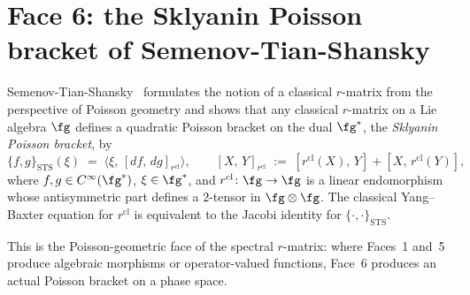 \section{Face 6: the Sklyanin Poisson bracket of Semenov-Tian-Shansky}
\label{sec:hdm-face-6}

\begin{theorem}
\label{thm:hdm-sts-sklyanin-bracket}
Semenov-Tian-Shansky~\cite{STS83} formulates the notion of a
classical $r$-matrix from the perspective of Poisson geometry and
shows that any classical $r$-matrix on a Lie algebra $\fg$ defines a
quadratic Poisson bracket on the dual $\fg^*$, the
\emph{Sklyanin Poisson bracket}, by
\begin{equation}\label{eq:hdm-sklyanin-bracket}
\{f, g\}_{\mathrm{STS}}(\xi)
\;=\;
\bigl\langle \xi,\, [df,\, dg]_{r^{\mathrm{cl}}}\bigr\rangle,
\qquad
[X,\, Y]_{r^{\mathrm{cl}}}
\;:=\;
[r^{\mathrm{cl}}(X),\, Y] + [X,\, r^{\mathrm{cl}}(Y)],
\end{equation}
where $f, g \in C^\infty(\fg^*)$, $\xi \in \fg^*$, and
$r^{\mathrm{cl}}\colon \fg \to \fg$ is a linear endomorphism whose
antisymmetric part defines a $2$-tensor in $\fg \otimes \fg$. The
classical Yang--Baxter equation for $r^{\mathrm{cl}}$ is equivalent
to the Jacobi identity for $\{\cdot,\cdot\}_{\mathrm{STS}}$.
\end{theorem}

This is the Poisson-geometric face of the spectral $r$-matrix: where Faces~1
and~5 produce algebraic morphisms or operator-valued functions, Face~6
produces an actual Poisson bracket on a phase space.

